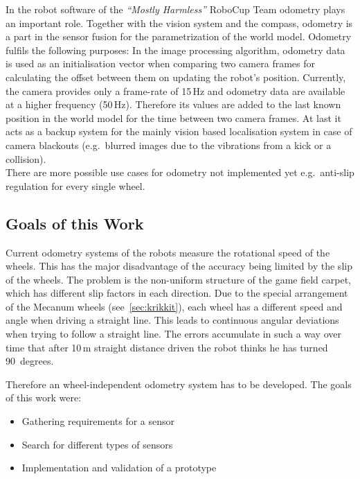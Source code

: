 \documentclass[12pt,a4paper]{article}
\newcommand{\MH}{\emph{``Mostly Harmless''} RoboCup Team\xspace}
\begin{document}
In the robot software of the \MH odometry plays an important role.
Together with the vision system and the compass, odometry is a part in the sensor fusion for the parametrization of the world model.
Odometry fulfils the following purposes:
In the image processing algorithm, odometry data is used as an initialisation vector when comparing two camera frames for calculating the offset between them on updating the robot's position.
Currently, the camera provides only a frame-rate of 15\,Hz and odometry data are available at a higher frequency (50\,Hz).
Therefore its values are added to the last known position in the world model for the time between two camera frames.
At last it acts as a backup system for the mainly vision based localisation system in case of camera blackouts (e.g.\ blurred images due to the vibrations from a kick or a collision).\\
There are more possible use cases for odometry not implemented yet e.g.\ anti-slip regulation for every single wheel.

\subsection{Goals of this Work}
\label{motivation}
  
Current odometry systems of the robots measure the rotational speed of the wheels.
This has the major disadvantage of the accuracy being limited by the slip of the wheels. 
The problem is the non-uniform structure of the game field carpet, which has different slip factors in each direction.
Due to the special arrangement of the Mecanum wheels (see~\autoref{sec:krikkit}), each wheel has a different speed and angle when driving a straight line.
This leads to continuous angular deviations when trying to follow a straight line.
The errors accumulate in such a way over time that after 10\,m straight distance driven the robot thinks he has turned 90~degrees.


Therefore an wheel-independent odometry system has to be developed.
The goals of this work were:
\begin{itemize}
  \item Gathering requirements for a sensor
  \item Search for different types of sensors
  \item Implementation and validation of a prototype
\end{itemize}




\clearpage
\end{document}
